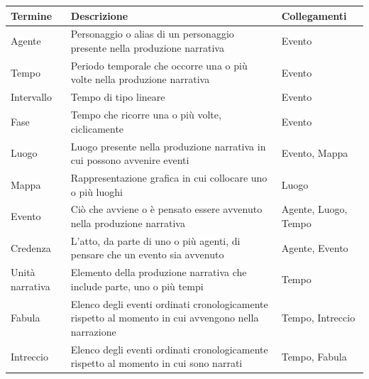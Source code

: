 \documentclass{article}
\begin{document}
\begin{center}\begin{tabular}{|p{}|p{}|p{}|}
		\hline
		\textbf{Termine} & \textbf{Descrizione}                                                                                & \textbf{Collegamenti} \\
		\hline
		Agente           & Personaggio o alias di un personaggio presente nella produzione narrativa                           & Evento                \\
		\hline
		Tempo            & Periodo temporale che occorre una o più volte nella produzione narrativa                            & Evento                \\
		\hline
		Intervallo       & Tempo di tipo lineare                                                                               & Evento                \\
		\hline
		Fase             & Tempo che ricorre una o più volte, ciclicamente                                                     & Evento                \\
		\hline
		Luogo            & Luogo presente nella produzione narrativa in cui possono avvenire eventi                            & Evento, Mappa         \\
		\hline
		Mappa            & Rappresentazione grafica in cui collocare uno o più luoghi                                          & Luogo                 \\
		\hline
		Evento           & Ciò che avviene o è pensato essere avvenuto nella produzione narrativa                              & Agente, Luogo, Tempo  \\
		\hline
		Credenza         & L'atto, da parte di uno o più agenti, di pensare che un evento sia avvenuto                         & Agente, Evento        \\
		\hline
		Unità narrativa  & Elemento della produzione narrativa che include parte, uno o più tempi                              & Tempo                 \\
		\hline
		Fabula           & Elenco degli eventi ordinati cronologicamente rispetto al momento in cui avvengono nella narrazione & Tempo, Intreccio      \\
		\hline
		Intreccio        & Elenco degli eventi ordinati cronologicamente rispetto al momento in cui sono narrati               & Tempo, Fabula         \\
		\hline
	\end{tabular}\end{center}
\end{document}
